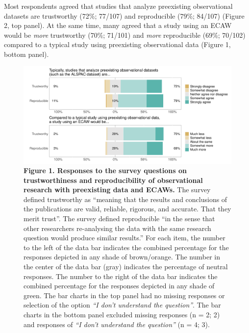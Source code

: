 \documentclass[
  man,floatsintext]{apa6}
\begin{document}
Most respondents agreed that studies that analyze preexisting observational datasets are trustworthy (72\%; 77/107) and reproducible (79\%; 84/107) (Figure 2, top panel). At the same time, many agreed that a study using an ECAW would be \emph{more} trustworthy (70\%; 71/101) and \emph{more} reproducible (69\%; 70/102) compared to a typical study using preexisting observational data (Figure 1, bottom panel).

\begin{figure}

{\centering \includegraphics[width=1\linewidth]{figs/typicallyEcawPlot-1} 

}

\caption{\textbf{Figure 1. Responses to the survey questions on trustworthiness and reproducibility of observational research with preexisting data and ECAWs.} The survey defined trustworthy as ``meaning that the results and conclusions of the publications are valid, reliable, rigorous, and accurate. That they merit trust''. The survey defined reproducible ``in the sense that other researchers re-analysing the data with the same research question would produce similar results.'' For each item, the number to the left of the data bar indicates the combined percentage for the responses depicted in any shade of brown/orange. The number in the center of the data bar (gray) indicates the percentage of neutral responses. The number to the right of the data bar indicates the combined percentage for the responses depicted in any shade of green. The bar charts in the top panel had no missing responses or selection of the option \emph{``I don't understand the question''}. The bar charts in the bottom panel excluded missing responses (n = 2; 2) and responses of \emph{``I don't understand the question''} (n = 4; 3).}\label{fig:typicallyEcawPlot}
\end{figure}
\end{document}
